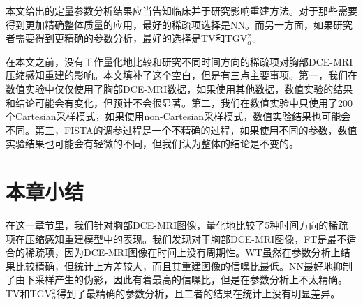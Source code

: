 本文给出的定量参数分析结果应当告知临床并于研究影响重建方法。对于那些需要得到更加精确整体质量的应用，最好的稀疏项选择是NN。而另一方面，如果研究者需要得到更精确的参数分析，最好的选择是TV和TGV$_{\alpha}^2$。

在本文之前，没有工作量化地比较和研究不同时间方向的稀疏项对胸部DCE-MRI压缩感知重建的影响。本文填补了这个空白，但是有三点主要事项。第一，我们在数值实验中仅仅使用了胸部DCE-MRI数据，如果使用其他数据，数值实验的结果和结论可能会有变化，但预计不会很显著。第二，我们在数值实验中只使用了200个Cartesian采样模式，如果使用non-Cartesian采样模式，数值实验结果也可能会不同。第三，FISTA的调参过程是一个不精确的过程，如果使用不同的参数，数值实验结果也可能会有轻微的不同，但我们认为整体的结论是不变的。

\section{本章小结}
在这一章节里，我们针对胸部DCE-MRI图像，量化地比较了5种时间方向的稀疏项在压缩感知重建模型中的表现。我们发现对于胸部DCE-MRI图像，FT是最不适合的稀疏项，因为DCE-MRI图像在时间上没有周期性。WT虽然在参数分析上结果比较精确，但统计上方差较大，而且其重建图像的信噪比最低。NN最好地抑制了由下采样产生的伪影，因此有着最高的信噪比，但是在参数分析上不太精确。TV和TGV$_{\alpha}^2$得到了最精确的参数分析，且二者的结果在统计上没有明显差异。



